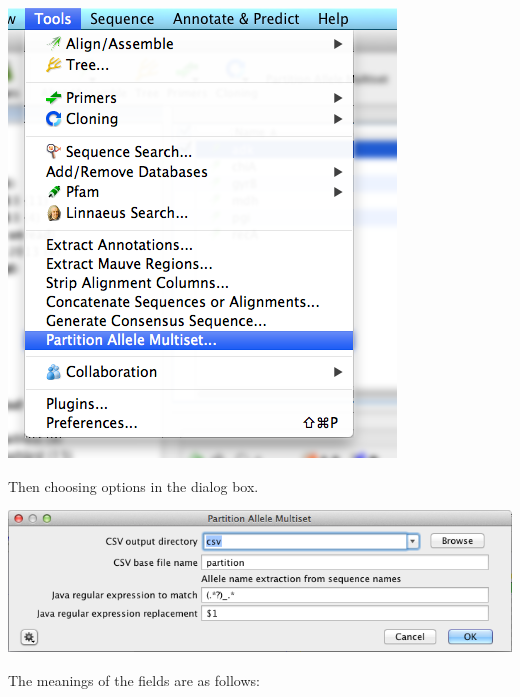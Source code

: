 \documentclass[12pt,letterpaper]{article}
\begin{document}
\hfill

\includegraphics[resolution=130]{menu_entry.png}

\hfill

Then choosing options in the dialog box.

\hfill

\includegraphics[resolution=130]{dialog_box.png}

\hfill

The meanings of the fields are as follows:
\end{document}

